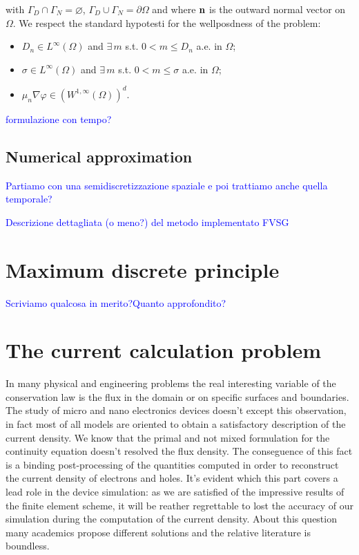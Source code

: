 with $\Gamma_D\cap\Gamma_N=\varnothing$, $\Gamma_D\cup\Gamma_N=\partial \Omega$ and where $\mathbf{n}$ is the outward normal vector on $\Omega$.
We respect the standard hypotesti for the wellposdness of the problem:
\begin{itemize}
\item $D_n \in L^{\infty}(\Omega)$ and $\exists \, m$ s.t. $0<m\leq D_n$ a.e. in $\Omega$;
\item $\sigma \in L^{\infty}(\Omega)$ and $\exists \, m$ s.t. $0<m\leq \sigma$ a.e. in $\Omega$;
\item $\mu_n \nabla \varphi \in (W^{1,\infty}(\Omega))^d$.
\end{itemize}

\textcolor{blue}{formulazione con tempo?}


\subsection{Numerical approximation}

\textcolor{blue}{Partiamo con una semidiscretizzazione spaziale e poi trattiamo anche quella temporale?}

\textcolor{blue}{Descrizione dettagliata (o meno?) del metodo implementato FVSG}

\section{Maximum discrete principle}
\textcolor{blue}{Scriviamo qualcosa in merito?Quanto approfondito?}


\section{The current calculation problem}

In many physical and engineering problems the real interesting variable of the conservation law is the flux in the domain or on specific surfaces and boundaries. The study of micro and nano electronics devices doesn't except this observation, in fact most of all models are oriented to obtain a satisfactory description of the current density.
 We know that the primal and not mixed formulation for  the continuity equation doesn't resolved  the flux density. The conseguence of this fact is a binding post-processing of the quantities computed in order to reconstruct the current density of electrons and holes.
It's evident which this part covers a lead role in the device simulation: 
as we are satisfied of the impressive results of the finite element scheme, it will be reather regrettable to lost the accuracy of our simulation during the computation of the current density.
About this question many academics propose different solutions and  the relative literature is boundless.
 
